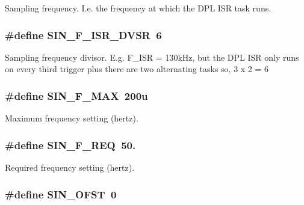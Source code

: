 Sampling frequency. I.\-e. the frequency at which the D\-P\-L I\-S\-R task runs. \hypertarget{a00045_ae3860ce29591dbf34c90a5cdce35ad86}{
\subsubsection[{S\-I\-N\-\_\-\-F\-\_\-\-I\-S\-R\-\_\-\-D\-V\-S\-R}]{\setlength{\rightskip}{0pt plus 5cm}\#define S\-I\-N\-\_\-\-F\-\_\-\-I\-S\-R\-\_\-\-D\-V\-S\-R~6}}\label{a00045_ae3860ce29591dbf34c90a5cdce35ad86}
Sampling frequency divisor. E.\-g. F\-\_\-\-I\-S\-R = 130k\-Hz, but the D\-P\-L I\-S\-R only runs on every third trigger plus there are two alternating tasks so, 3 x 2 = 6 \hypertarget{a00045_a67755e274de5a3185ae6ce437a5f6e7d}{
\subsubsection[{S\-I\-N\-\_\-\-F\-\_\-\-M\-A\-X}]{\setlength{\rightskip}{0pt plus 5cm}\#define S\-I\-N\-\_\-\-F\-\_\-\-M\-A\-X~200u}}\label{a00045_a67755e274de5a3185ae6ce437a5f6e7d}
Maximum frequency setting (hertz). \hypertarget{a00045_a58bd24055692a8794616ff2bc5c84d51}{
\subsubsection[{S\-I\-N\-\_\-\-F\-\_\-\-R\-E\-Q}]{\setlength{\rightskip}{0pt plus 5cm}\#define S\-I\-N\-\_\-\-F\-\_\-\-R\-E\-Q~50.}}\label{a00045_a58bd24055692a8794616ff2bc5c84d51}
Required frequency setting (hertz). \hypertarget{a00045_a992c375a2083a58aa46c0600fea7df64}{
\subsubsection[{S\-I\-N\-\_\-\-O\-F\-S\-T}]{\setlength{\rightskip}{0pt plus 5cm}\#define S\-I\-N\-\_\-\-O\-F\-S\-T~0}}\label{a00045_a992c375a2083a58aa46c0600fea7df64}
